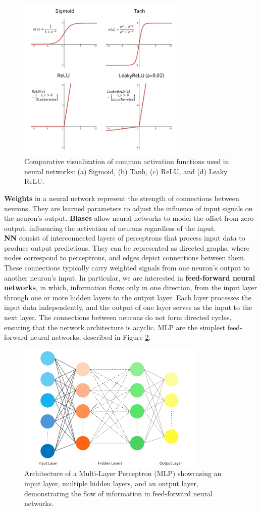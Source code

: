 \begin{figure}[ht]
    \centering
    \includegraphics[width=8cm]{images/Theory-DL/ActGraphs.png}
    \caption{Comparative visualization of common activation functions used in neural networks: (a) Sigmoid, (b) Tanh, (c) ReLU, and (d) Leaky ReLU.}
    \label{fig:ActGraphs}
  \end{figure}
\textbf{Weights} in a neural network represent the strength of connections between neurons. They are learned parameters to adjust the influence of input signals on the neuron's output. \textbf{Biases} allow neural networks to model the offset from zero output, influencing the activation of neurons regardless of the input.\\
\textbf{\gls{NN}} consist of interconnected layers of perceptrons that process input data to produce output predictions. They can be represented as directed graphs, where nodes correspond to perceptrons, and edges depict connections between them. These connections typically carry weighted signals from one neuron's output to another neuron's input. In particular, we are interested in \textbf{feed-forward neural networks}, in which, information flows only in one direction, from the input layer through one or more hidden layers to the output layer. Each layer processes the input data independently, and the output of one layer serves as the input to the next layer. The connections between neurons do not form directed cycles, ensuring that the network architecture is acyclic. \gls{MLP} are the simplest feed-forward neural networks, described in Figure \ref{fig:MLP}. 
\begin{figure}[ht]
    \centering
    \includegraphics[width=9cm]{images/Theory-DL/MLP.png}
    \caption{Architecture of a Multi-Layer Perceptron (MLP) showcasing an input layer, multiple hidden layers, and an output layer, demonstrating the flow of information in feed-forward neural networks.}
    \label{fig:MLP}
  \end{figure}
